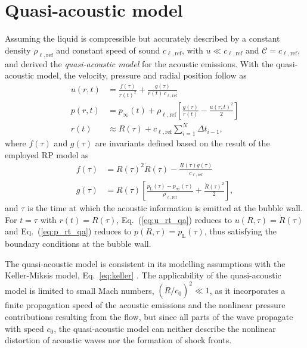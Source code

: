 \section{Quasi-acoustic model}
\label{sec:emissionsqa}

Assuming the liquid is compressible but accurately described by a constant density $\rho_{\ell,\mathrm{ref}}$ and constant speed of sound $c_{\ell,\mathrm{ref}}$, with $u \ll c_{\ell,\mathrm{ref}}$ and $\mathcal{C} = c_{\ell,\mathrm{ref}}$, \citet{Trilling1952} and \citet{Gilmore1952} derived the {\it quasi-acoustic model} for the acoustic emissions. With the quasi-acoustic model, the velocity, pressure and radial position follow as
\begin{align}
    u(r,t) &= \frac{f(\tau)}{r(t)^2} + \frac{g(\tau)}{r(t) \, c_{\ell,\mathrm{ref}}}  \label{eq:u_rt_qa} \\
  p(r,t) &=  p_\infty(t) + \rho_{\ell,\mathrm{ref}} \left[ \frac{g(\tau)}{r(t)} - \frac{u(r,t)^2}{2} \right] \label{eq:p_rt_qa} \\
  r(t) &\approx R(\tau) + c_{\ell,\mathrm{ref}} \sum_{i=1}^N \Delta t_{i-1}, \label{eq:r_t_qa}
\end{align}
where $f(\tau)$ and $g(\tau)$ are invariants defined based on the result of the employed RP model as
\begin{align}
    f(\tau) &= R(\tau)^2 \dot{R}(\tau) - \frac{R(\tau) g(\tau)}{c_{\ell,\mathrm{ref}}}\\
    g(\tau) &= R(\tau) \left[\frac{p_\mathrm{L}(\tau)-p_\infty(\tau)}{\rho_{\ell,\mathrm{ref}}} + \frac{\dot{R}(\tau)^2}{2} \right], \label{eq:g_qa}
\end{align}
and $\tau$ is the time at which the acoustic information is emitted at the bubble wall. For $t=\tau$ with $r(t)=R(\tau)$, Eq.~(\ref{eq:u_rt_qa}) reduces to $u(R,\tau)=\dot{R}(\tau)$ and Eq.~(\ref{eq:p_rt_qa}) reduces to $p(R,\tau)=p_\mathrm{L}(\tau)$, thus satisfying the boundary conditions at the bubble wall. 

The quasi-acoustic model is consistent in its modelling assumptions with the Keller-Miksis model, Eq.~\eqref{eq:keller} \citep{Coulombel2024}. The applicability of the quasi-acoustic model is limited to small Mach numbers, $(\dot{R}/c_0)^2 \ll 1$, as it incorporates a finite propagation speed of the acoustic emissions and the nonlinear pressure contributions resulting from the flow, but since all parts of the wave propagate with speed $c_0$, the quasi-acoustic model can neither describe the nonlinear distortion of acoustic waves nor the formation of shock fronts. 

